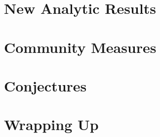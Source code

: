 \documentclass{beamer}
\begin{document}
\section{New Analytic Results}
		
		\begin{frame}\frametitle{}
		  
		\end{frame}

\section{Community Measures}
		
		\begin{frame}\frametitle{}
		  	
		\end{frame}

\section{Conjectures}
		
		\begin{frame}\frametitle{}
		  
		\end{frame}

\section{Wrapping Up}
		
		\begin{frame}\frametitle{}
		  
		\end{frame}

	
\end{document}
